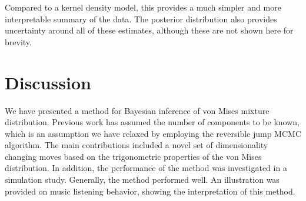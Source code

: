 Compared to a kernel density model, this provides a much simpler and more interpretable summary of the data. The posterior distribution also provides uncertainty around all of these estimates, although these are not shown here for brevity. 

\begin{table}
	\centering
	\caption{Estimated component parameters for individual genres in \textit{22tracks} data. LB and UB indicate the lower and upper bound of the 95\% density of the data density of this von Mises component. Components have been ordered according to their respective weights.}
	\label{tab:22tracks}
\end{table}


\section{Discussion}
\label{secrev:discussion}
We have presented a method for Bayesian inference of von Mises mixture distribution. Previous work has assumed the number of components to be known, which is an assumption we have relaxed by employing the reversible jump MCMC algorithm. The main contributions included a novel set of dimensionality changing moves based on the trigonometric properties of the von Mises distribution. In addition, the performance of the method was investigated in a simulation study. Generally, the method performed well. An illustration was provided on music listening behavior, showing the interpretation of this method.


